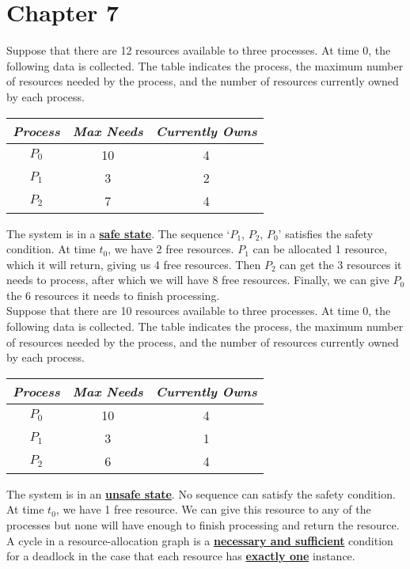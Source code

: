 \documentclass[10pt]{article}
\newcommand{\qw}[1]{\textbf{\ul{#1}}}
\begin{document}
\section*{\centering Chapter 7}
Suppose that there are 12 resources available to three processes. At time 0, the following data is collected. The table indicates the process, the maximum number of resources needed by the process, and the number of resources currently owned by each process.\\
\begin{table}[H]
\centering
\begin{tabular}{ccc}
\textit{Process} & \textit{Max Needs} & \textit{Currently Owns} \\ \hline
$P_0$ & 10 & 4 \\
$P_1$ & 3 & 2 \\
$P_2$ & 7 & 4 \\ \hline
\end{tabular}
\end{table}
The system is in a \qw{safe state}. The sequence `$P_1$, $P_2$, $P_0$' satisfies the safety condition.
At time $t_0$, we have 2 free resources. $P_1$ can be allocated 1 resource, 
which it will return, giving us 4 free resources. Then $P_2$ can get the 3 resources it needs to process,
after which we will have 8 free resources. Finally, we can give $P_0$ the 6 resources it needs to finish processing.\\[2mm]
Suppose that there are 10 resources available to three processes. At time 0, the following data is collected. The table indicates the process, the maximum number of resources needed by the process, and the number of resources currently owned by each process.\\
\begin{table}[H]
\centering
\begin{tabular}{ccc}
\textit{Process} & \textit{Max Needs} & \textit{Currently Owns} \\ \hline
$P_0$ & 10 & 4 \\
$P_1$ & 3 & 1 \\
$P_2$ & 6 & 4 \\ \hline
\end{tabular}
\end{table}
The system is in an \qw{unsafe state}. No sequence can satisfy the safety condition.
At time $t_0$, we have 1 free resource. We can give this resource to any of the processes but none
will have enough to finish processing and return the resource.\\[2mm]
A cycle in a resource-allocation graph is a \qw{necessary and sufficient} condition for a deadlock in the case that each resource has \qw{exactly one} instance.\\[2mm]
\end{document}
